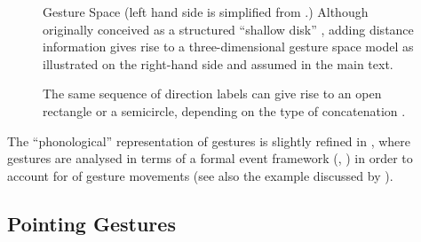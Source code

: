 \documentclass[output=paper]{langsci/langscibook}
\begin{document}
\begin{figure}[tb]
  \caption[Gesture Space]{Gesture Space (left hand side is simplified from \citet[]{McNeill:1992}.) Although originally conceived as a structured \enquote{shallow disk} \citet[]{McNeill:1992}, adding distance information gives rise to a three-dimensional gesture space model as illustrated on the right-hand side and assumed in the main text.}
  \label{fig:gesture-space}
\end{figure}


\begin{figure}[tb]
  \centering
  \caption{The same sequence of direction labels can give rise to an open rectangle or a semicircle, depending on the type of concatenation \citep[]{Luecking:2016}.}
  \label{fig:move-direction}
\end{figure}


The \enquote{phonological} representation of gestures is slightly refined in \citet[--386]{Luecking:2016}, where gestures are analysed in terms of a formal event framework  (\cite{Fernando:2011}, \citet[Sec.~2.7]{Cooper:Ginzburg:2015}) in order to account for  of gesture movements (see also the example discussed by \citet{Rieser:2008}).




\subsection{Pointing Gestures}
\label{sec:pointing-gestures}
\end{document}

